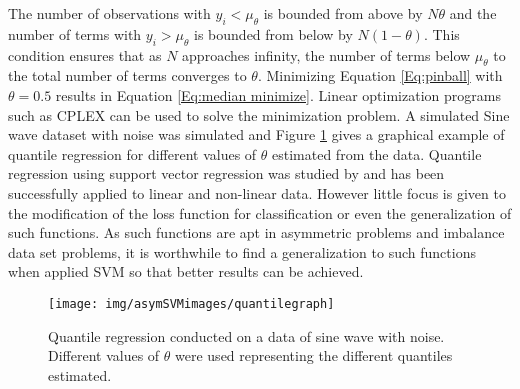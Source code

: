 \documentclass[twoside,11pt]{article}
\begin{document}
The number of observations with $y_i < \mu_{\theta}$ is bounded from above by $N\theta$ and the number of terms with $y_i > \mu_{\theta}$ is bounded from below by $N(1-\theta)$. This condition ensures that as $N$ approaches infinity, the number of terms below $\mu_{\theta}$ to the total number of terms converges to $\theta$. Minimizing Equation \ref{Eq:pinball} with $\theta=0.5$ results in Equation \ref{Eq:median minimize}. Linear optimization programs such as CPLEX can be used to solve the minimization problem. A simulated Sine wave dataset with noise was simulated and Figure \ref{Fig:Quantile Regression} gives a graphical example of quantile regression for different values of $\theta$ estimated from the data. Quantile regression using support vector regression was studied by \citet{Changha05} and has been successfully applied to linear and non-linear data. However little focus is given to the modification of the loss function for classification or even the generalization of such functions. As such functions are apt in asymmetric problems and imbalance data set problems, it is worthwhile to find a generalization to such functions when applied SVM so that better results can be achieved. 

\begin{figure}
 \centering
\texttt{[image: img/asymSVMimages/quantilegraph]}\\
 \caption{Quantile regression conducted on a data of sine wave with noise. Different values of $\theta$ were used representing the different quantiles estimated.}
 \label{Fig:Quantile Regression}
\end{figure}
\end{document}
